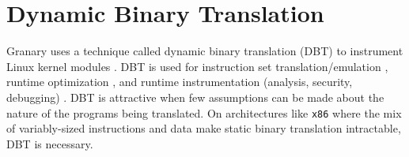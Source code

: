 \documentclass[preprint]{sigplanconf}
\newcommand{\comment}[1]{}
\begin{document}
%	

\section{Dynamic Binary Translation}\label{sec:dbt}


Granary uses a technique called dynamic binary translation (DBT) to instrument Linux kernel modules \cite{DynamoRIO}. DBT is used for instruction set translation/emulation \cite{QEMU}, runtime optimization \cite{DynamoRIOOptimisation}, and runtime instrumentation (analysis, security, debugging) \cite{Vx32,NaCl,Valgrind}. DBT is attractive when few assumptions can be made about the nature of the programs being translated. On architectures like \texttt{x86} where the mix of variably-sized instructions and data make static binary translation intractable, DBT is necessary.
\end{document}
